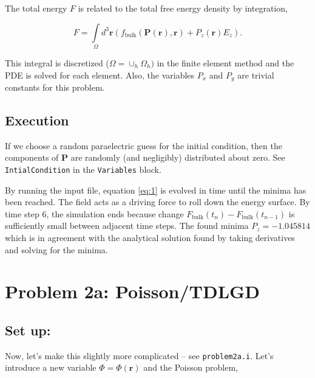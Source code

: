 \documentclass[paper=a4, fontsize=14pt]{scrartcl} %
\numberwithin{equation}{section} %
\numberwithin{figure}{section} %
\numberwithin{table}{section} %
\begin{document}
The total energy $F$ is related to the total free energy density by integration,

$$F = \int\limits_\Omega d^3 \textbf{r}  \left(  f_\mathrm{bulk}(\textbf{P} (\textbf{r}),\textbf{r}) + P_z (\textbf{r}) E_z \right).$$

This integral is discretized ($\Omega = \cup_h \Omega_h )$ in the finite element method and the PDE is solved for each element. Also, the variables $P_x$ and $P_y$ are trivial constants for this problem.

\vspace{-15pt}

\subsection*{Execution}

\vspace{-8pt}

If we choose a random paraelectric guess for the initial condition, then the components of $\textbf{P}$ are randomly (and negligibly) distributed about zero.  See \texttt{IntialCondition} in the \texttt{Variables} block.


By running the input file, equation \ref{eq:1} is evolved in time until the minima has been reached. The field acts as a driving force to roll down the energy surface. By time step 6, the simulation ends because change $F_\mathrm{bulk} (t_n)  - F_\mathrm{bulk} (t_{n-1})$ is sufficiently small between adjacent time steps. The found minima $P_z = - 1.045814$ which is in agreement with the analytical solution found by taking derivatives and solving for the minima. 

\newpage

\vspace*{-65pt}

\section*{Problem 2a: Poisson/TDLGD}

\vspace*{-10pt}

\subsection*{Set up:}

Now, let's make this slightly more complicated -- see \texttt{problem2a.i}. Let's introduce a new variable $\Phi = \Phi (\textbf{r})$ and the Poisson problem,
\end{document}
